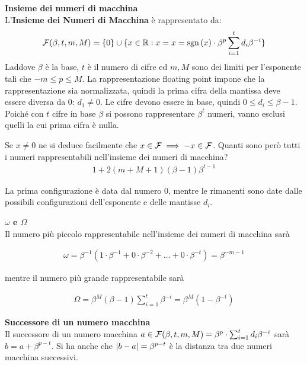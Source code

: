 \begin{defn}
    \textbf{Insieme dei numeri di macchina} \\
    L'\textbf{Insieme dei Numeri di Macchina} è rappresentato da:
\begin{eqnarray*}
\mathcal{F}(\beta, t, m, M) = \{0\} \cup \{x \in \mathbb{R} : x = x = \text{sgn}\left(x\right) \cdot \beta^p \sum_{i=1}^{t} d_i \beta^{-i} \}
\end{eqnarray*}
Laddove $\beta$ è la base, $t$ è il numero di cifre ed $m, M$ sono dei limiti per l'esponente tali che $-m \leq p \leq M$. La rappresentazione floating point impone che la rappresentazione sia normalizzata, quindi la prima cifra della mantissa deve essere diversa da 0: $d_1 \neq 0$. Le cifre devono essere in base, quindi $0 \leq d_i \leq \beta-1$. Poiché con $t$ cifre in base $\beta$ si possono rappresentare $\beta^t$ numeri, vanno esclusi quelli la cui prima cifra è nulla.


Se $x \neq 0$ ne si deduce facilmente che
$x \in \mathcal{F} \implies -x \in \mathcal{F}$.
Quanti sono però tutti i numeri rappresentabili nell'insieme dei numeri di macchina?
\begin{equation*}
    \begin{aligned}
        1 + 2(m + M + 1) (\beta -1) \beta^{t-1}
    \end{aligned}
\end{equation*}

\end{defn}
La prima configurazione è data dal numero 0, mentre le rimanenti sono date dalle possibili configurazioni dell'esponente e delle mantisse $d_i$.

\begin{defn}
    \textbf{$\omega$ e $\Omega$} \\
    Il numero più piccolo rappresentabile nell'insieme dei numeri di macchina sarà

    \begin{eqnarray*}
        \omega = \beta^{-1}(1 \cdot \beta^{-1} + 0 \cdot \beta^{-2} + \hdots + 0 \cdot \beta^{-t}) = \beta^{-m-1}
    \end{eqnarray*}

    mentre il numero più grande rappresentabile sarà

    \begin{eqnarray*}
        \Omega = \beta^M (\beta -1) \sum_{i=1}^{t} \beta^{-i} = \beta^M (1-\beta^{-t})
    \end{eqnarray*}
\end{defn}


\begin{defn}
    \textbf{Successore di un numero macchina} \\
    Il successore di un numero macchina $a \in \mathcal{F}(\beta, t, m, M) = \beta^p \cdot \sum_{i=1}^{t} d_i \beta^{-i}$ sarà $b = a + \beta^{p-t}$. Si ha anche che $\lvert b-a\rvert = \beta^{p-t}$ è la distanza tra due numeri macchina successivi.

\end{defn}


